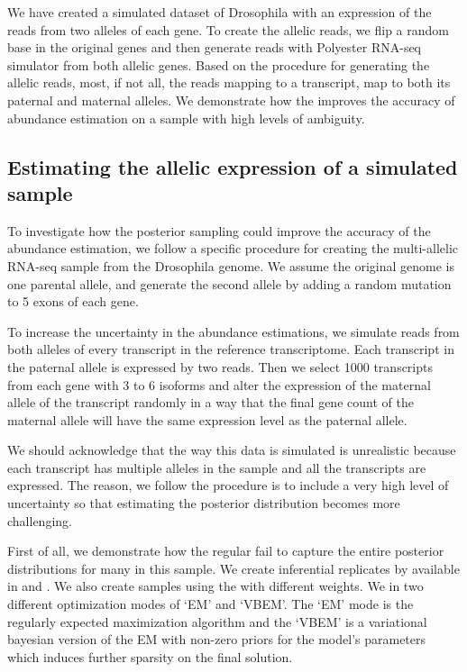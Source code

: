 We have created a simulated dataset of Drosophila with an expression of the reads from two alleles of 
each gene. To create the allelic reads, we flip a random base in the original genes and then generate
reads with Polyester RNA-seq simulator\cite{frazee2015polyester} from both allelic genes. Based on the 
procedure for generating the allelic reads, most, if not all, the reads mapping to a transcript, map 
to both its paternal and maternal alleles. We demonstrate how the \aboot improves the accuracy of abundance
estimation on a sample with high levels of ambiguity.

\subsection{Estimating the allelic expression of a simulated sample}

To investigate how the posterior sampling could improve the accuracy of the abundance estimation, we follow 
a specific procedure for creating the multi-allelic RNA-seq sample from the Drosophila genome. %
We assume the original genome is one parental allele, and generate the second allele by
adding a random mutation to 5 exons of each gene.

To increase the uncertainty in the abundance estimations, we simulate reads from both alleles of every
transcript in the reference transcriptome. Each transcript in the paternal allele is expressed by 
two reads. Then we select 1000 transcripts from each gene with 3 to 6 isoforms and alter the 
expression of the maternal allele of the transcript randomly in a way that the final gene count of the 
maternal allele will have the same expression level as the paternal allele.


We should acknowledge that the way this data is simulated is unrealistic because each transcript has
multiple alleles in the sample and all the transcripts are expressed. The reason, we follow the procedure
is to include a very high level of uncertainty so that estimating the posterior distribution becomes
more challenging.

First of all, we demonstrate how the regular \boots fail to capture the entire posterior distributions
for many \txps in this sample. We create inferential replicates by \boots available in \salmon and 
\kallisto. We also create \boot samples using the \aboots with different weights. We \salmon in two
different optimization modes of `EM' and `VBEM'. The `EM' mode is the regularly expected maximization 
algorithm and the `VBEM' is a variational bayesian version of the EM with non-zero priors for the 
model's parameters which induces further sparsity on the final solution.


